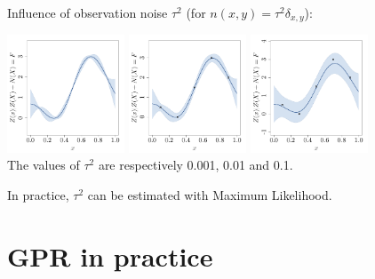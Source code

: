 \documentclass{beamer}
\begin{document}
\begin{frame}{}
Influence of observation noise $\tau^2$ (for $n(x,y)=\tau^2 \delta_{x,y}$):
\begin{center}
\includegraphics[height=3.5cm]{figures/R/ch34_GPRnoise0001} 
\includegraphics[height=3.5cm]{figures/R/ch34_GPRnoise001} 
\includegraphics[height=3.5cm]{figures/R/ch34_GPRnoise01}\\
The values of $\tau^2$ are respectively 0.001, 0.01 and 0.1.
\end{center}
In practice, $\tau^2$ can be estimated with Maximum Likelihood. 
\end{frame}

\section{GPR in practice}
\subsection{}
\end{document}
